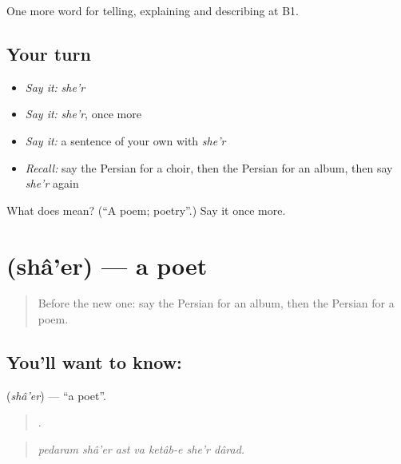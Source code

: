 \begin{grammarlens}[title={What you've built}]
One more word for telling, explaining and describing at B1.
\end{grammarlens}

\subsection*{Your turn}
\begin{itemize}
\raggedright
  \item \emph{Say it:} \emph{she'r}
  \item \emph{Say it:} \emph{she'r}, once more
  \item \emph{Say it:} a sentence of your own with \emph{she'r}
  \item \emph{Recall:} say the Persian for a choir, then the Persian for an album, then say \emph{she'r} again
\end{itemize}

\begin{tcolorbox}[breakable,colback=teal!4,colframe=teal!35!black,title={Before you move on}]
What does  mean? (\textquotedblleft{}A poem; poetry\textquotedblright{}.) Say it once more.
\end{tcolorbox}
\section[\texorpdfstring{\fa{شاعر} (shâ'er)}{شاعر (shâ'er)}]{ (shâ'er) — a poet}

\label{lesson:FA-C521-shaer}



\begin{quote}
Before the new one: say the Persian for an album, then the Persian for a poem.
\end{quote}

\subsection*{You'll want to know: }
\textbf{} (\emph{shâ'er}) — \textquotedblleft{}a poet\textquotedblright{}.

\begin{quote}
      .
\end{quote}

\begin{quote}
\emph{pedaram shâ'er ast va ketâb-e she'r dârad.}
\end{quote}

